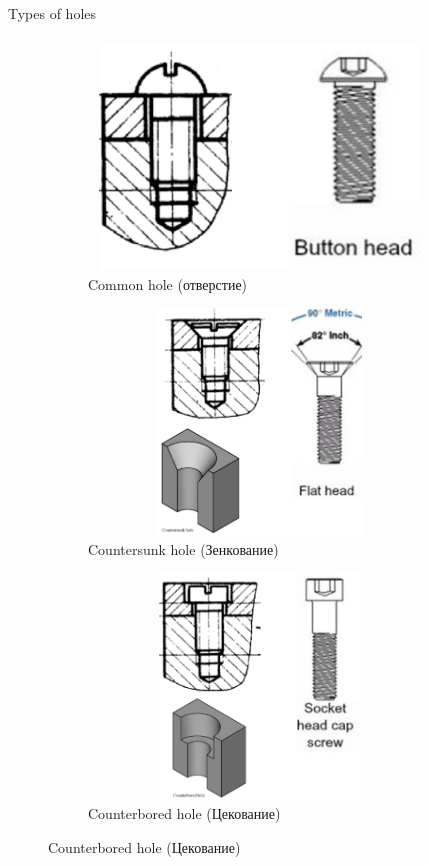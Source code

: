 \documentclass[aspectratio=169]{beamer}
\begin{document}
\begin{frame}[t]{Types of holes}
    \framesubtitle{}
    \vspace{-0.6cm}
    \begin{figure}[H]
        \begin{subfigure}{0.32\textwidth}
            \centering\includegraphics[height=6cm,width=1\textwidth,keepaspectratio]{common_hole.png}
            \caption*{Common hole (отверстие)}
            \label{fig:common_hole.png}
        \end{subfigure}
        \begin{subfigure}{0.32\textwidth}
            \centering\includegraphics[height=6cm,width=1\textwidth,keepaspectratio]{countersunk_hole.png}
            \caption*{Countersunk hole (Зенкование)}
            \label{fig:countersunk_hole.png}
        \end{subfigure}
        \begin{subfigure}{0.32\textwidth}
            \centering\includegraphics[height=6cm,width=1\textwidth,keepaspectratio]{counterbored_hole.png}
            \caption*{Counterbored hole (Цекование)}
            \label{fig:counterbored_hole.png}
        \end{subfigure}
    \end{figure}
\end{frame}
\end{document}
